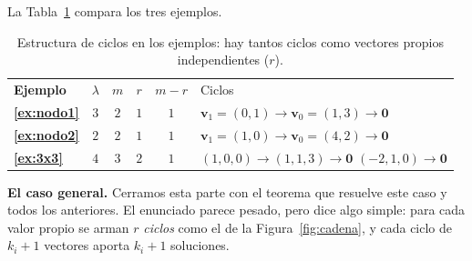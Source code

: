 La Tabla~\ref{tab:resumen-defectuosos} compara los tres ejemplos.

\begin{table}[H]
\centering
\renewcommand{\arraystretch}{1.4}
\begin{tabular}{>{\bfseries}l c c c c p{.42\linewidth}}
\rowcolor{bbe!15}
\textcolor{bbe}{Ejemplo} & \textcolor{bbe}{$\lambda$} & \textcolor{bbe}{$m$} & \textcolor{bbe}{$r$} & \textcolor{bbe}{$m-r$} & \textcolor{bbe}{Ciclos} \\
\ref{ex:nodo1} & $3$ & $2$ & $1$ & $1$ & $\mathbf v_1=(0,1)\to\mathbf v_0=(1,3)\to\mathbf 0$ \\
\ref{ex:nodo2} & $2$ & $2$ & $1$ & $1$ & $\mathbf v_1=(1,0)\to\mathbf v_0=(4,2)\to\mathbf 0$ \\
\ref{ex:3x3} & $4$ & $3$ & $2$ & $1$ & $(1,0,0)\to(1,1,3)\to\mathbf 0$ \newline $(-2,1,0)\to\mathbf 0$ \\
\end{tabular}
\caption{Estructura de ciclos en los ejemplos: hay tantos ciclos como vectores propios independientes ($r$).}
\label{tab:resumen-defectuosos}
\end{table}

\textbf{El caso general.} Cerramos esta parte con el teorema que resuelve este caso y todos los anteriores. El enunciado parece pesado, pero dice algo simple: para cada valor propio se arman $r$ \emph{ciclos} como el de la Figura~\ref{fig:cadena}, y cada ciclo de $k_i+1$ vectores aporta $k_i+1$ soluciones.

